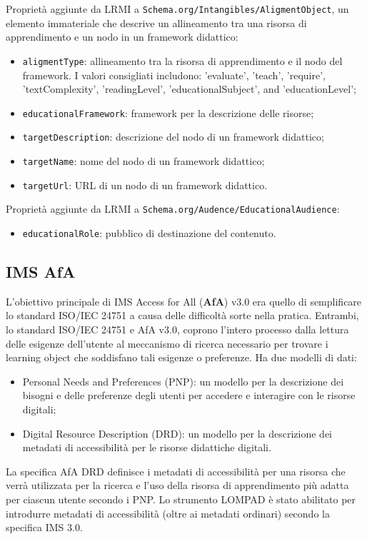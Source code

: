 Proprietà aggiunte da LRMI a \texttt{Schema.org/Intangibles/AligmentObject}, un elemento immateriale che descrive un allineamento tra una risorsa di apprendimento e un nodo in un framework didattico:
\begin{itemize}
\item \texttt{aligmentType}: allineamento tra la risorsa di apprendimento e il nodo del framework. I valori consigliati includono: 'evaluate', 'teach', 'require', 'textComplexity', 'readingLevel', 'educationalSubject', and 'educationLevel';
\item \texttt{educationalFramework}: framework per la descrizione delle risorse;
\item \texttt{targetDescription}: descrizione del nodo di un framework didattico;
\item \texttt{targetName}: nome del nodo di un framework didattico;
\item \texttt{targetUrl}: URL di un nodo di un framework didattico.
\end{itemize}

Proprietà aggiunte da LRMI a \texttt{Schema.org/Audence/EducationalAudience}:
\begin{itemize}
\item \texttt{educationalRole}: pubblico di destinazione del contenuto.
\end{itemize}

\subsection{IMS AfA}
L'obiettivo principale di IMS Access for All (\textbf{AfA}) v3.0 era quello di semplificare lo standard ISO/IEC 24751 a causa delle difficoltà sorte nella pratica. Entrambi, lo standard ISO/IEC 24751 e AfA v3.0, coprono l'intero processo dalla lettura delle esigenze dell'utente al meccanismo di ricerca necessario per trovare i learning object che soddisfano tali esigenze o preferenze. Ha due modelli di dati:
\begin{itemize}
\item Personal Needs and Preferences (PNP): un modello per la descrizione dei bisogni e delle preferenze degli utenti per accedere e interagire con le risorse digitali;
\item Digital Resource Description (DRD): un modello per la descrizione dei metadati di accessibilità per le risorse didattiche digitali.
\end{itemize}

La specifica AfA DRD definisce i metadati di accessibilità per una risorsa che verrà utilizzata per la ricerca e l'uso della risorsa di apprendimento più adatta per ciascun utente secondo i PNP. Lo strumento LOMPAD è stato abilitato per introdurre metadati di accessibilità (oltre ai metadati ordinari) secondo la specifica IMS 3.0.


